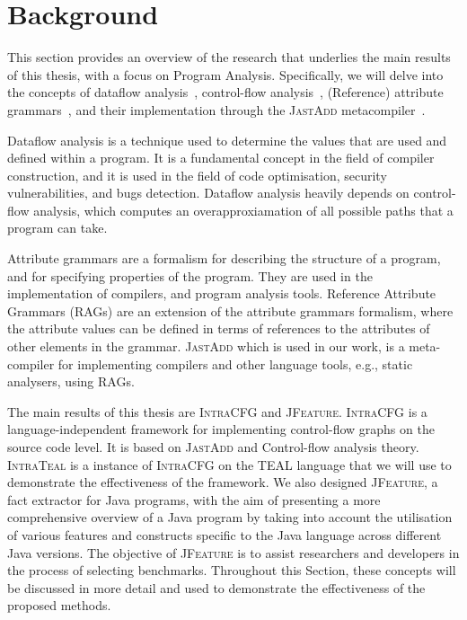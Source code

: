 \section{Background}
\label{sec:background}
This section provides an overview of the research that underlies the main results
of this thesis, with a focus on Program Analysis. Specifically, we will delve into
the concepts of dataflow analysis~\cite{aho2007compilers,Nielson2010Principles},
control-flow analysis~\cite{allen1970control}, (Reference) attribute grammars~\cite{knuth1968semantics, DBLP:journals/informaticaSI/Hedin00},
and their implementation through the \textsc{JastAdd} metacompiler~\cite{DBLP:journals/entcs/HedinM01}.

Dataflow analysis is a technique used to determine the values that are used and
defined within a program. It is a fundamental concept in the field of compiler
construction, and it is used in the field of code optimisation, security vulnerabilities, and bugs detection.
Dataflow analysis heavily depends on control-flow analysis, which computes an overapproxiamation of
all possible paths that a program can take.

Attribute grammars are a formalism for describing the structure of a program,
and for specifying properties of the program. They are used in the implementation
of compilers, and program analysis tools.
Reference Attribute Grammars (RAGs) are an extension of the attribute grammars formalism,
where the attribute values can be defined in terms of references to the attributes
of other elements in the grammar. \textsc{JastAdd} which is used in our work, is a meta-compiler
for implementing compilers and other language tools, e.g., static analysers, using RAGs.

The main results of this thesis are \textsc{IntraCFG} and \textsc{JFeature}.
\textsc{IntraCFG} is a language-independent framework for implementing control-flow graphs
on the source code level.
It is based on \textsc{JastAdd} and Control-flow analysis theory. \textsc{IntraTeal} is a instance
of \textsc{IntraCFG} on the TEAL language that we will use to demonstrate the effectiveness
of the framework. We also designed \textsc{JFeature}, a fact extractor for Java programs,
with the aim of presenting a more comprehensive overview of a Java program by
taking into account the utilisation of various features and constructs specific
to the Java language across different Java versions. The objective of \textsc{JFeature} is
to assist researchers and developers in the process of selecting benchmarks.
Throughout this Section, these concepts will be discussed in more detail and used to
demonstrate the effectiveness of the proposed methods.

